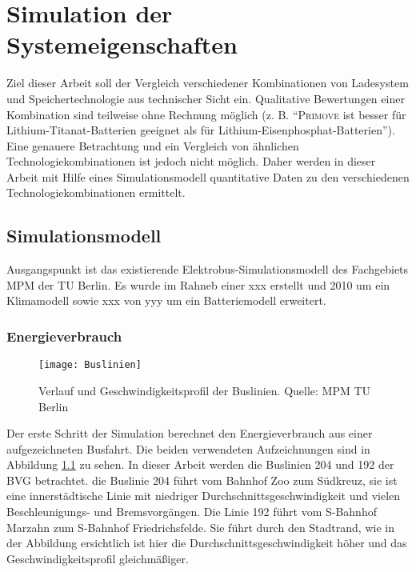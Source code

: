 \chapter{Simulation der Systemeigenschaften}
\label{chap4}
Ziel dieser Arbeit soll der Vergleich verschiedener Kombinationen von Ladesystem und Speichertechnologie aus technischer Sicht ein. Qualitative Bewertungen einer Kombination sind teilweise ohne Rechnung möglich (z. B. "`\textsc{Primove} ist besser für Lithium-Titanat-Batterien geeignet als für Lithium-Eisenphosphat-Batterien"'). Eine genauere Betrachtung und ein Vergleich von ähnlichen Technologiekombinationen ist jedoch nicht möglich. Daher werden in dieser Arbeit mit Hilfe eines Simulationsmodell quantitative Daten zu den verschiedenen Technologiekombinationen ermittelt.

\section{Simulationsmodell}
 Ausgangspunkt ist das existierende Elektrobus-Simulationsmodell des Fachgebiets MPM der TU Berlin. Es wurde im Rahneb einer xxx erstellt und 2010 um ein Klimamodell sowie xxx von yyy um ein Batteriemodell erweitert.

\subsection{Energieverbrauch}

\begin{figure}\centering
	\texttt{[image: Buslinien]}
	\caption[Verlauf und Geschwindigkeitsprofil der Buslinien]{Verlauf und Geschwindigkeitsprofil der Buslinien. Quelle: MPM TU Berlin}
	\label{Buslinien}
\end{figure}

Der erste Schritt der Simulation berechnet den Energieverbrauch aus einer aufgezeichneten Busfahrt. Die beiden verwendeten Aufzeichnungen sind in Abbildung \ref{Buslinien} zu sehen. In dieser Arbeit werden die Buslinien 204 und 192 der BVG betrachtet. die Buslinie 204 führt vom Bahnhof Zoo zum Südkreuz, sie ist eine innerstädtische Linie mit niedriger Durchschnittsgeschwindigkeit und vielen Beschleunigungs- und Bremsvorgängen. Die Linie 192 führt vom S-Bahnhof Marzahn zum S-Bahnhof Friedrichsfelde. Sie führt durch den Stadtrand, wie in der Abbildung ersichtlich ist hier die Durchschnittsgeschwindigkeit höher und das Geschwindigkeitsprofil gleichmäßiger.

